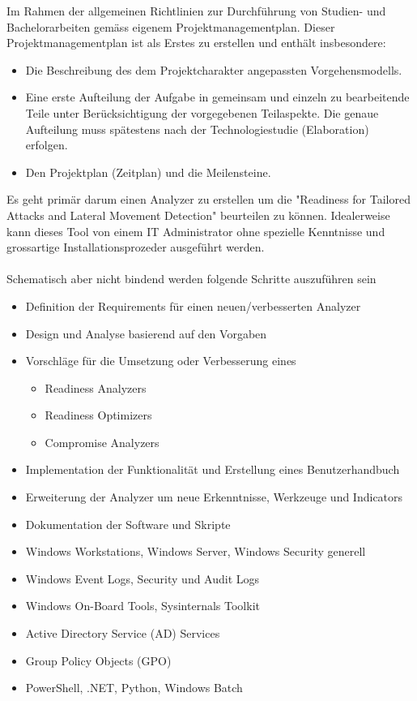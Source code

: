 \thispagestyle{plain}
Im Rahmen der allgemeinen Richtlinien zur Durchführung von Studien- und Bachelorarbeiten gemäss eigenem Projektmanagementplan. Dieser Projektmanagementplan ist als Erstes zu erstellen und enthält insbesondere:
\begin{itemize}
    \item Die Beschreibung des dem Projektcharakter angepassten Vorgehensmodells.
    \item Eine erste Aufteilung der Aufgabe in gemeinsam und einzeln zu bearbeitende Teile unter Berücksichtigung der vorgegebenen Teilaspekte. Die genaue Aufteilung muss spätestens nach der Technologiestudie (Elaboration) erfolgen.
    \item Den Projektplan (Zeitplan) und die Meilensteine.
\end{itemize}

Es geht primär darum einen Analyzer zu erstellen um die "Readiness for Tailored Attacks and Lateral Movement Detection" beurteilen zu können. Idealerweise kann dieses Tool von einem IT Administrator ohne spezielle Kenntnisse und grossartige Installationsprozeder ausgeführt werden. 
\\\\
Schematisch aber nicht bindend werden folgende Schritte auszuführen sein
\begin{itemize}
    \item Definition der Requirements für einen neuen/verbesserten Analyzer
    \item Design und Analyse basierend auf den Vorgaben
    \item Vorschläge für die Umsetzung oder Verbesserung eines 
    \begin{itemize}
        \item Readiness Analyzers
        \item Readiness Optimizers
        \item Compromise Analyzers
    \end{itemize}
    \item Implementation der Funktionalität und Erstellung eines Benutzerhandbuch
    \item Erweiterung der Analyzer um neue Erkenntnisse, Werkzeuge und Indicators
    \item Dokumentation der Software und Skripte
\end{itemize}

\begin{itemize}
    \item Windows Workstations, Windows Server, Windows Security generell
    \item Windows Event Logs, Security und Audit Logs
    \item Windows On-Board Tools, Sysinternals Toolkit
    \item Active Directory Service (AD) Services
    \item Group Policy Objects (GPO)
    \item PowerShell, .NET, Python, Windows Batch
\end{itemize}

